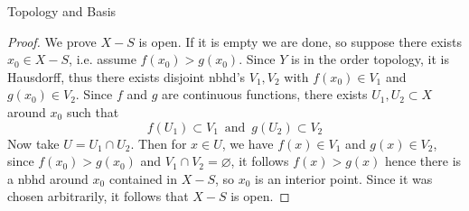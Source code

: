 \begin{chapter}{Topology and Basis}
   \newpage
   \begin{proof}
    We prove $X -S$ is open. If it is empty we are done, so suppose there exists $x_0 \in X - S$, i.e. assume 
    $f(x_0) > g(x_0)$. Since $Y$ is in the order topology, it is Hausdorff, thus there exists disjoint nbhd's $V_1, V_2$ with 
    $f(x_0) \in V_1$ and $g(x_0) \in V_2$. Since $f$ and $g$ are continuous functions, there exists $U_1, U_2 \subset X$ around $x_0$ such that 
    \[f(U_1) \subset V_1 \, \text{ and } \, g(U_2) \subset V_2\]
    Now take $U = U_1 \cap U_2$. Then for $x \in U$, we have $f(x) \in V_1 $ and $g(x) \in V_2$, since $f(x_0)> g(x_0)$ and $V_1 \cap V_2 = \varnothing$, 
    it follows $f(x) > g(x)$ hence there is a nbhd around $x_0$ contained in $X-S$, so $x_0$ is an interior point. Since it was chosen arbitrarily, it follows that 
    $X - S$ is open. 
    
    

   \end{proof}
    
\end{chapter}
